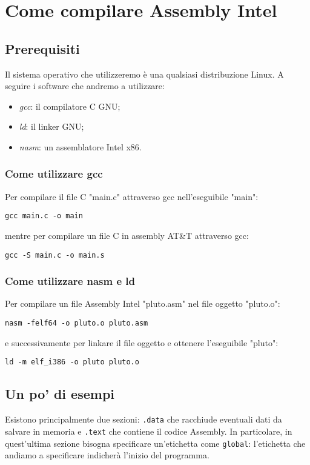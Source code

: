 \documentclass[class=book, crop=false, oneside]{standalone}
\begin{document}
\chapter{Come compilare Assembly Intel}

\section{Prerequisiti}
Il sistema operativo che utilizzeremo è una qualsiasi distribuzione Linux. A seguire i software che andremo a utilizzare:
\begin{itemize}
	\item \emph{gcc}: il compilatore C GNU;
	\item \emph{ld}: il linker GNU;
	\item \emph{nasm}: un assemblatore Intel x86.
\end{itemize}

\subsection{Come utilizzare gcc}
Per compilare il file C "main.c" attraverso gcc nell'eseguibile "main":
\begin{verbatim}
gcc main.c -o main
\end{verbatim}
mentre per compilare un file C in assembly AT\&T attraverso gcc:
\begin{verbatim}
gcc -S main.c -o main.s
\end{verbatim}

\subsection{Come utilizzare nasm e ld}
Per compilare un file Assembly Intel "pluto.asm" nel file oggetto "pluto.o":
\begin{verbatim}
nasm -felf64 -o pluto.o pluto.asm
\end{verbatim}
e successivamente per linkare il file oggetto e ottenere l'eseguibile "pluto":
\begin{verbatim}
ld -m elf_i386 -o pluto pluto.o
\end{verbatim}

\section{Un po' di esempi}
Esistono principalmente due sezioni: \texttt{.data} che racchiude eventuali dati da salvare in memoria e \texttt{.text} che contiene il codice Assembly. In particolare, in quest'ultima sezione bisogna specificare un'etichetta come \texttt{global}: l'etichetta che andiamo a specificare indicherà l'inizio del programma.
\end{document}
